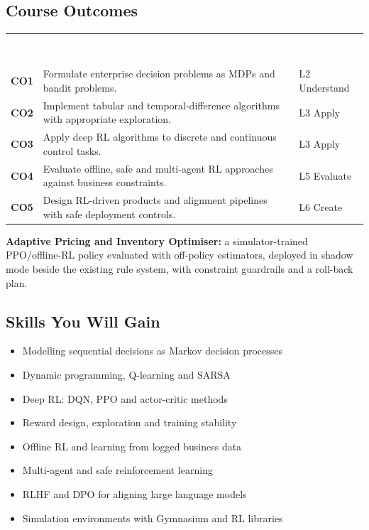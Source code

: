\documentclass[10pt,a4paper]{article}
\newcommand{\hdr}{\rowcolor{navy}}
\newcommand{\hw}[1]{\textcolor{white}{\bfseries #1}}
\begin{document}
\subsection*{Course Outcomes}
\par{\small\begin{tabularx}{\linewidth}{@{}>{\bfseries}p{0.9cm}Y>{\raggedright\arraybackslash}p{2.3cm}@{}}\hdr\hw{CO}&\hw{On completion, the learner will be able to}&\hw{Bloom Level}\\
CO1 & Formulate enterprise decision problems as MDPs and bandit problems. & L2 Understand\\
CO2 & Implement tabular and temporal-difference algorithms with appropriate exploration. & L3 Apply\\
CO3 & Apply deep RL algorithms to discrete and continuous control tasks. & L3 Apply\\
CO4 & Evaluate offline, safe and multi-agent RL approaches against business constraints. & L5 Evaluate\\
CO5 & Design RL-driven products and alignment pipelines with safe deployment controls. & L6 Create\\
\bottomrule\end{tabularx}}
\begin{tcolorbox}[colback=goldbg,colframe=goldl,boxrule=0.7pt,arc=2pt,title={Enterprise Capstone Product},colbacktitle=goldl!35,coltitle=navy,fonttitle=\small\bfseries]\small\textbf{Adaptive Pricing and Inventory Optimiser:} a simulator-trained PPO/offline-RL policy evaluated with off-policy estimators, deployed in shadow mode beside the existing rule system, with constraint guardrails and a roll-back plan.\end{tcolorbox}
\subsection*{Skills You Will Gain}\begin{multicols}{2}\begin{itemize}\small
\item Modelling sequential decisions as Markov decision processes
\item Dynamic programming, Q-learning and SARSA
\item Deep RL: DQN, PPO and actor-critic methods
\item Reward design, exploration and training stability
\item Offline RL and learning from logged business data
\item Multi-agent and safe reinforcement learning
\item RLHF and DPO for aligning large language models
\item Simulation environments with Gymnasium and RL libraries
\end{itemize}\end{multicols}
\end{document}
